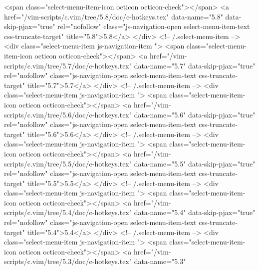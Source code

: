               <span class="select-menu-item-icon octicon octicon-check"></span>
              <a href="/vim-scripts/c.vim/tree/5.8/doc/c-hotkeys.tex"
                 data-name="5.8"
                 data-skip-pjax="true"
                 rel="nofollow"
                 class="js-navigation-open select-menu-item-text css-truncate-target"
                 title="5.8">5.8</a>
            </div> <!-- /.select-menu-item -->
            <div class="select-menu-item js-navigation-item ">
              <span class="select-menu-item-icon octicon octicon-check"></span>
              <a href="/vim-scripts/c.vim/tree/5.7/doc/c-hotkeys.tex"
                 data-name="5.7"
                 data-skip-pjax="true"
                 rel="nofollow"
                 class="js-navigation-open select-menu-item-text css-truncate-target"
                 title="5.7">5.7</a>
            </div> <!-- /.select-menu-item -->
            <div class="select-menu-item js-navigation-item ">
              <span class="select-menu-item-icon octicon octicon-check"></span>
              <a href="/vim-scripts/c.vim/tree/5.6/doc/c-hotkeys.tex"
                 data-name="5.6"
                 data-skip-pjax="true"
                 rel="nofollow"
                 class="js-navigation-open select-menu-item-text css-truncate-target"
                 title="5.6">5.6</a>
            </div> <!-- /.select-menu-item -->
            <div class="select-menu-item js-navigation-item ">
              <span class="select-menu-item-icon octicon octicon-check"></span>
              <a href="/vim-scripts/c.vim/tree/5.5/doc/c-hotkeys.tex"
                 data-name="5.5"
                 data-skip-pjax="true"
                 rel="nofollow"
                 class="js-navigation-open select-menu-item-text css-truncate-target"
                 title="5.5">5.5</a>
            </div> <!-- /.select-menu-item -->
            <div class="select-menu-item js-navigation-item ">
              <span class="select-menu-item-icon octicon octicon-check"></span>
              <a href="/vim-scripts/c.vim/tree/5.4/doc/c-hotkeys.tex"
                 data-name="5.4"
                 data-skip-pjax="true"
                 rel="nofollow"
                 class="js-navigation-open select-menu-item-text css-truncate-target"
                 title="5.4">5.4</a>
            </div> <!-- /.select-menu-item -->
            <div class="select-menu-item js-navigation-item ">
              <span class="select-menu-item-icon octicon octicon-check"></span>
              <a href="/vim-scripts/c.vim/tree/5.3/doc/c-hotkeys.tex"
                 data-name="5.3"
